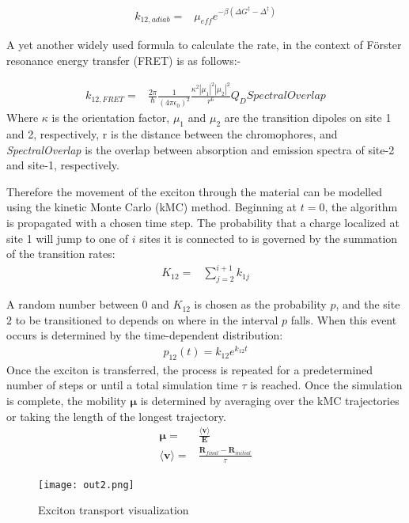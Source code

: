 \documentclass{article}
\begin{document}
\begin{align}
    k_{12,adiab}=&\mu_{eff}e^{-\beta(\Delta G^{\ddag}-\Delta^\ddag)}
\end{align}

A yet another widely used formula to calculate the rate, in the context of Förster resonance energy transfer (FRET) is as follows:-

\begin{align}
    k_{12,FRET}=&\frac{2\pi}{\hbar}\frac{1}{(4\pi\epsilon_0)^2} \frac{\kappa^2|\mu_1|^2|\mu_2|^2}{r^6}Q_DSpectralOverlap
\end{align}
Where $\kappa$ is the orientation factor, $\mu_1$ and $\mu_2$ are the transition dipoles on site 1 and 2, respectively, r is the distance between the chromophores, and \textit{SpectralOverlap} is the overlap between absorption and emission spectra of site-2 and site-1, respectively. 

Therefore the movement of the exciton through the material can be modelled using the kinetic Monte Carlo (kMC) method.\cite{Oberhofer2017ChargeMethods} Beginning at $t=0$, the algorithm is propagated with a chosen time step. The probability that a charge localized at site 1 will jump to one of $i$ sites it is connected to is governed by the summation of the transition rates:
\begin{align}
    K_{12}=&\sum_{j=2}^{i+1} k_{1j}
\end{align}

A random number between $0$ and $K_{12}$ is chosen as the probability $p$, and the site $2$ to be transitioned to depends on where in the interval $p$ falls. When this event occurs is determined by the time-dependent distribution:
\begin{align}
    p_{12}(t)=k_{12}e^{k_{12}t}
\end{align}
Once the exciton is transferred, the process is repeated for a predetermined number of steps or until a total simulation time $\tau$ is reached. 
Once the simulation is complete, the mobility $\mathbf{\mu}$ is determined by averaging over the kMC trajectories or taking the length of the longest trajectory.
\begin{align}
    \mathbf{\mu}=&\frac{\langle \mathbf{v}\rangle}{\mathbf{E}}\\
    \langle\mathbf{v}\rangle=&\frac{\mathbf{R}_{final}-\mathbf{R}_{initial}}{\tau}
\end{align}

\begin{figure}[H]
    \centering
  \texttt{[image: out2.png]}
    \caption{Exciton transport visualization}
    \label{fig:my_label}
\end{figure}
\end{document}

